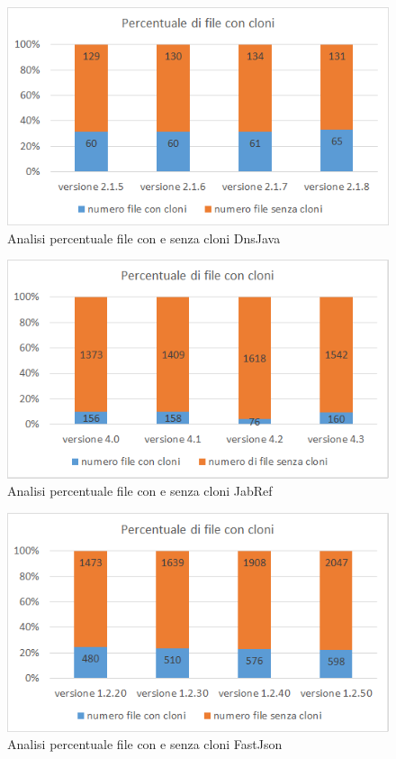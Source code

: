 \begin{figure}[h]
	\centering
	\includegraphics[scale=0.75, trim = 0cm 0cm 0cm 0cm, clip=true]{Grafici_dnsJava/PercentualeFileCloni.png}
	\caption{Analisi percentuale file con e senza cloni DnsJava}
	\label{fig:percentualeDnsJava}	
\end{figure}
\begin{figure}[h]
	\centering
	\includegraphics[scale=0.75, trim = 0cm 0cm 0cm 0cm, clip=true]{Grafici_jabRef/PercentualeFileCloni.png}
	\caption{Analisi percentuale file con e senza cloni JabRef}
	\label{fig:percentualeJabRef}
\end{figure}
\begin{figure}[h]
	\centering
	\includegraphics[scale=0.75, trim = 0cm 0cm 0cm 0cm, clip=true]{Grafici_fastJson/PercentualeFileCloni.png}
	\caption{Analisi percentuale file con e senza cloni FastJson}
	\label{fig:percentualeFastjson}
\end{figure}
